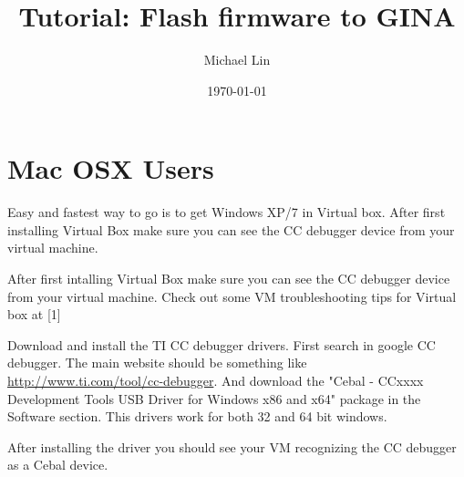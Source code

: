 \documentclass[12pt]{article}
\title{Tutorial: Flash firmware to GINA}
\author{Michael Lin}
\date{\today}
\begin{document}
\maketitle

\section{Mac OSX Users}
Easy and fastest way to go is to get Windows XP/7 in Virtual box. After first installing 
Virtual Box make sure you can see the CC debugger device from your virtual machine. 
\begin{enumarate}
\item After first intalling Virtual Box make sure you can see the CC debugger device from your virtual machine. Check 
out some VM troubleshooting tips for Virtual box at [1]
\item Download and install the TI CC debugger drivers. First search in google CC debugger. The main website should be 
something like \url{http://www.ti.com/tool/cc-debugger}. And download the "Cebal - CCxxxx Development Tools USB Driver for Windows x86 and x64"
package in the Software section. This drivers work for both 32 and 64 bit windows.
\item After installing the driver you should see your VM recognizing the CC debugger as a Cebal device.
\item 
\end{enumarate}
\end{document}

